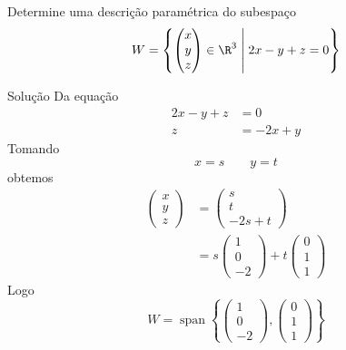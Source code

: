 \begin{question}
  Determine uma descrição paramétrica do subespaço
  \[
  W=
  \left\{
  \begin{pmatrix}
  x\\y\\z
  \end{pmatrix}
  \in\R^{3}
  \;\middle|\;
  2x-y+z=0
  \right\}
  \]
\end{question}

\begin{resolution}{Solução}
  Da equação
  \begin{align*}
  2x-y+z&=0\\
  z&=-2x+y
  \end{align*}
  Tomando
  \[
  x=s
  \qquad
  y=t
  \]
  obtemos
  \begin{align*}
  \begin{pmatrix}
  x\\y\\z
  \end{pmatrix}
  &=
  \begin{pmatrix}
  s\\t\\-2s+t
  \end{pmatrix}\\
  &=
  s
  \begin{pmatrix}
  1\\0\\-2
  \end{pmatrix}
  +
  t
  \begin{pmatrix}
  0\\1\\1
  \end{pmatrix}
  \end{align*}
  Logo
  \[
  W=
  \operatorname{span}
  \left\{
  \begin{pmatrix}
  1\\0\\-2
  \end{pmatrix}
  ,
  \begin{pmatrix}
  0\\1\\1
  \end{pmatrix}
  \right\}
  \]

\end{resolution}

\endinput
